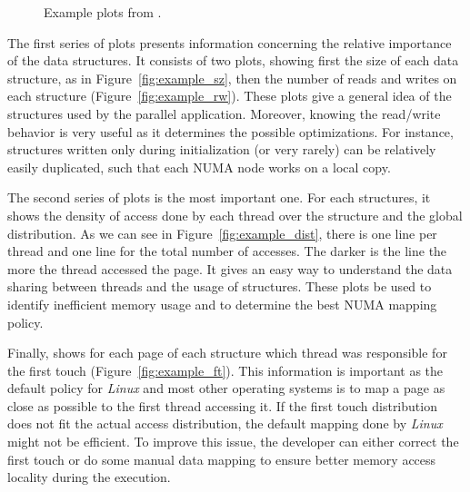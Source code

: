 \begin{figure}[htb]
    \centering
    \label{fig:example_plot1}
    \caption{Example plots from \TABARNAC.}
\end{figure}

The first series of plots presents information concerning the relative
importance of the data structures. It consists of two plots, showing first the
size of each data structure, as in Figure~\ref{fig:example_sz}, then the
number of reads and writes  on each structure (Figure~\ref{fig:example_rw}). These plots give a
general idea of the structures used by the parallel application.
Moreover, knowing the read/write behavior is very
useful as it determines the possible optimizations. For instance, structures
written only during initialization (or very rarely) can be relatively easily
duplicated, such that each NUMA node works on a local copy.

The second series of plots is the most important one. For each structures, it
shows the density of access done by each thread over the structure and the
global distribution. As we can see in Figure~\ref{fig:example_dist}, there is
one line per thread and one line for the total number of accesses. The darker
is the line the more the thread accessed the page. It gives an easy way to
understand the data sharing between threads and the usage of structures. These
plots be used to identify inefficient memory usage and to determine the best
NUMA mapping policy.



Finally, \TABARNAC shows for each page of each structure
which thread was responsible for the first touch
(Figure~\ref{fig:example_ft}). This information is important as the
default policy for \emph{Linux} and most other operating systems is to map a page as close as possible to the first
thread accessing it. If the first touch distribution does not fit the actual
access distribution, the default mapping done by \emph{Linux} might not be
efficient. To improve this issue, the developer can either correct the first
touch or do some manual data mapping to ensure better memory access locality
during the execution.
